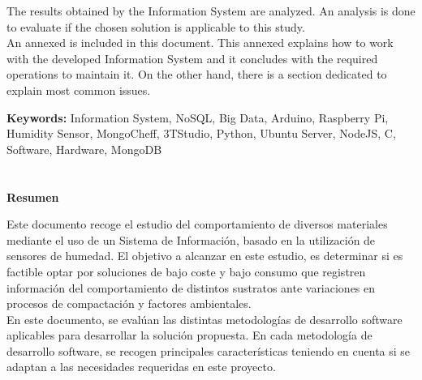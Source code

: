 The results obtained by the Information System are analyzed. An analysis is done to evaluate if the chosen solution is applicable to this study.\\

An annexed is included in this document. This annexed explains how to work with the developed Information System and it concludes with the required operations to maintain it. On the other hand, there is a section dedicated to explain most common issues.


\newpage
\noindent
{\bf Keywords:\newline}
Information System, NoSQL, Big Data, Arduino, Raspberry Pi, Humidity Sensor, MongoCheff, 3TStudio, Python, Ubuntu Server, NodeJS, C, Software, Hardware, MongoDB

\thispagestyle{empty}
\newpage

\chapter*{}
\begin{center}
\textbf{Resumen}
\end{center}

Este documento recoge el estudio del comportamiento de diversos materiales mediante el uso de un Sistema de Información, basado en la utilización de sensores de humedad. El objetivo a alcanzar en este estudio, es determinar si es factible optar por soluciones de bajo coste y bajo consumo que registren información del comportamiento de distintos sustratos ante variaciones en procesos de compactación y factores ambientales.\\

En este documento, se evalúan las distintas metodologías de desarrollo software aplicables para desarrollar la solución propuesta. En cada metodología de desarrollo software, se recogen principales características teniendo en cuenta si se adaptan a las necesidades requeridas en este proyecto.\\

